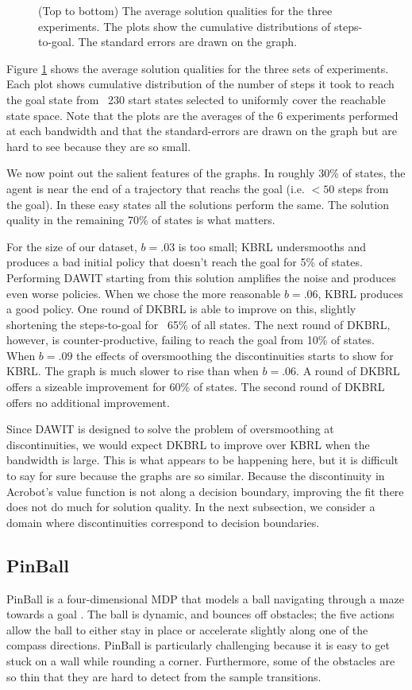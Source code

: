 \documentclass{article} %
\begin{document}
\begin{figure}[!htb]
  \endminipage\hfill
\caption{(Top to bottom) The average solution qualities for the three experiments.
The plots show the cumulative distributions of steps-to-goal.
The standard errors are drawn on the graph.}
\label{AcroFig}
\end{figure}

Figure \ref{AcroFig} shows the average solution qualities for the three sets of experiments.
Each plot shows cumulative distribution of the number of steps it took to reach the goal state
from ~230 start states selected to uniformly cover the reachable state space.
Note that the plots are the averages of the 6 experiments performed at each bandwidth
and that the standard-errors are drawn on the graph but are hard to see because they are so small.

We now point out the salient features of the graphs. 
In roughly 30\% of states, the agent is near the end of a trajectory
that reachs the goal (i.e. $<50$ steps from the goal).
In these easy states all the solutions perform the same.
The solution quality in the remaining 70\% of states is what matters.

For the size of our dataset, $b=.03$ is too small; KBRL undersmooths and produces a bad initial policy
that doesn't reach the goal for 5\% of states.
Performing DAWIT starting from this solution amplifies the noise and produces even worse policies.
When we chose the more reasonable $b=.06$, KBRL produces a good policy.
One round of DKBRL is able to improve on this, slightly shortening the steps-to-goal for
~65\% of all states.
The next round of DKBRL, however, is counter-productive, failing to reach the goal from 10\% of states.
When $b=.09$ the effects of oversmoothing the discontinuities starts to show for KBRL.
The graph is much slower to rise than when $b=.06$. A round of DKBRL offers a sizeable improvement
for  60\% of states. The second round of DKBRL offers no additional improvement.

Since DAWIT is designed to solve the problem of oversmoothing at discontinuities,
we would expect DKBRL to improve over KBRL when the bandwidth is large.
This is what appears to be happening here, but it is difficult to say for sure because the graphs
are so similar.
Because the discontinuity in Acrobot's value function is not along a decision boundary,
improving the fit there does not do much for solution quality.
In the next subsection, we consider a domain where discontinuities correspond to decision boundaries.

\subsection{PinBall}
PinBall is a four-dimensional MDP that models a ball navigating through a maze towards
a goal \cite{gdk}. The ball is dynamic, and bounces off obstacles;
the five actions allow the ball to either stay in place or accelerate slightly
along one of the compass directions.
PinBall is particularly challenging because it is easy to get stuck on a wall
while rounding a corner.
Furthermore, some of the obstacles are so thin that they are hard to detect
from the sample transitions.
\end{document}
